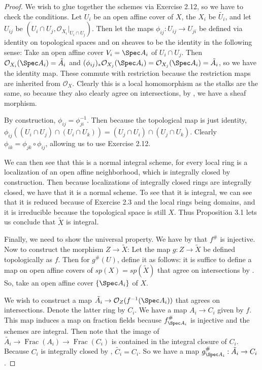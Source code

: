 \begin{proof}
	We wish to glue together the schemes via Exercise 2.12, so we have to check the conditions.
	Let $U_i $ be an open affine cover of $X $, the $X_i $ be $\tilde{U_i} $, and let $U_{ij} $ be $(U_{i}\cap U_j, \mathcal{O}_{X_i}\big|_{U_i\cap U_j})$.
	Then let the maps $\phi _{ij}: U_{ij} \to U_{ji} $ be defined via identity on topological spaces and on sheaves to be the identity in the following sense:
	Take an open affine cover $V_{i} = \Spec A_i$ of $U_{i}\cap U_{j} $.
	Then $\mathcal{O}_{X_i}(\Spec A_i) = \tilde{A_i}$ and $(\phi _{ij})_\ast \mathcal{O}_{X_j}(\Spec A_i) = \mathcal{O}_{X_j}(\Spec A_i) = \tilde{A_i}$, so we have the identity map.
	These commute with restriction because the restriction maps are inherited from $\mathcal{O}_X $.
	Clearly this is a local homomorphism as the stalks are the same, so because they also clearly agree on intersections, by , we have a sheaf morphism.

	By construction, $\phi _{ij} = \phi _{ji}^{-1} $.
	Then because the topological map is just identity, $\phi _{ij}((U_i\cap U_j)\cap (U_i\cap U_k)) = (U_j \cap U_i) \cap (U_j \cap U_k) $.
	Clearly $\phi _{ik} = \phi _{jk}\circ \phi _{ij} $, allowing us to use Exercise 2.12.

	We can then see that this is a normal integral scheme, for every local ring is a localization of an open affine neighborhood, which is integrally closed by construction.
	Then because localizations of integrally closed rings are integrally closed, we have that it is a normal scheme.
	To see that it is integral, we can see that it is reduced because of Exercise 2.3 and the local rings being domains, and it is irreducible because the topological space is still $X $.
	Thus Proposition 3.1 lets us conclude that $\tilde{X} $ is integral.

	Finally, we need to show the universal property.
	We have by  that $f^\# $ is injective.
	Now to construct the morphism $Z\to \tilde{X} $:
	Let the map $g:Z\to \tilde{X} $ be defined topologically as $f $.
	Then for $g^\#(U) $, define it as follows: it is suffice to define a map on open affine covers of $sp(X) = sp(\tilde{X}) $ that agree on intersections by .
	So, take an open affine cover $\{\Spec A_i\}   $ of $X $.

	We wish to construct a map $\tilde{A_i} \to \mathcal{O}_Z(f^{-1}(\Spec A_i)) $ that agrees on intersections.
	Denote the latter ring by $C_i $.
	We have a map $A_i \to C_i $ given by $f $.
	This map induces a map on fraction fields because $f^\#_{\Spec A_i} $ is injective and the schemes are integral.
	Then note that the image of $\tilde{A_i} \to \operatorname{Frac}(A_i) \to \operatorname{Frac}(C_i)$ is contained in the integral closure of $C_i $.
	Because $C_i$ is integrally closed by , $\tilde{C_i} = C_i $.
	So we have a map $g^\#_{\Spec A_i}:\tilde{A_i}\to C_i $.


\end{proof}
